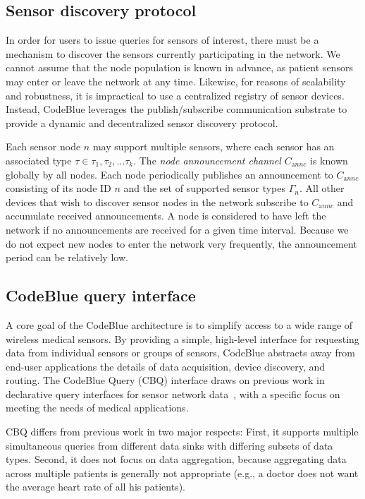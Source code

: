 \subsection{Sensor discovery protocol}

In order for users to issue queries for sensors of interest, there
must be a mechanism to discover the sensors currently participating in
the network. We cannot assume that the node population is known in
advance, as patient sensors may enter or leave the network at any
time. Likewise, for reasons of scalability and robustness, it is
impractical to use a centralized registry of sensor devices. Instead,
CodeBlue leverages the publish/subscribe communication substrate to
provide a dynamic and decentralized sensor discovery protocol.

Each sensor node $n$ may support multiple sensors, where
each sensor has an associated type $\tau \in {\tau_1, \tau_2,
... \tau_k}$. The {\em node announcement channel} $C_{\mathrm annc}$
is known globally by all nodes. Each node periodically publishes an
announcement to $C_{\mathrm annc}$ consisting of its node ID $n$ and
the set of supported sensor types  $\Gamma_{n}$. All other devices that wish
to discover sensor nodes in the network subscribe to $C_{\mathrm
annc}$ and accumulate received announcements. A node is considered to
have left the network if no announcements are received for a given
time interval.  Because we do not expect new nodes to enter the
network very frequently, the announcement period can be relatively
low.

\subsection{CodeBlue query interface}
\label{sec-cb-query}

A core goal of the CodeBlue architecture is to simplify access to a
wide range of wireless medical sensors. By providing a simple,
high-level interface for requesting data from individual sensors or
groups of sensors, CodeBlue abstracts away from end-user applications
the details of data acquisition, device discovery, and routing. The
CodeBlue Query (CBQ) interface draws on previous work in declarative
query interfaces for sensor network
data~\cite{tinydb-osdi,cougar-sigmodrecord,diffusion}, with a specific focus on meeting
the needs of medical applications.

CBQ differs from previous work in two major respects: First, it
supports multiple simultaneous queries from different data sinks with
differing subsets of data types.  Second, it does not focus on data
aggregation, because aggregating data across multiple
patients is generally not appropriate (e.g., a doctor does not want the
average heart rate of all his patients).

